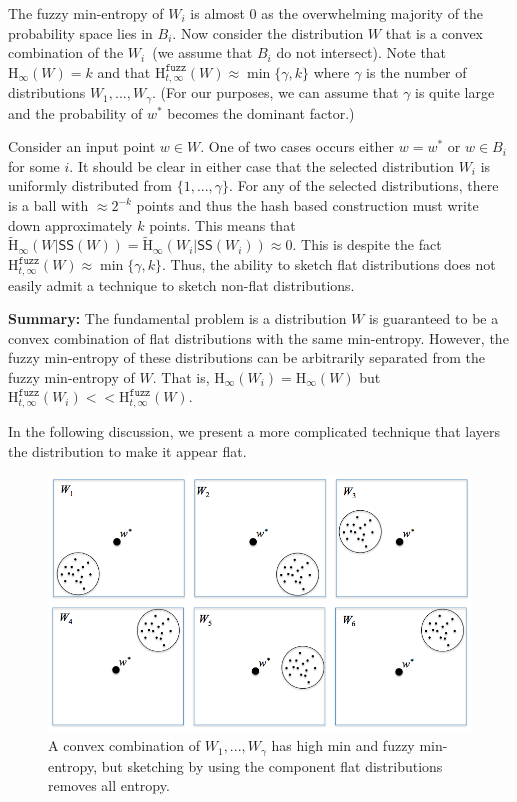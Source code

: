 \documentclass[11pt]{article}
\newcommand{\class}[1]{{\ensuremath{\mathsf{#1}}}}
\newcommand{\sketch}{\ensuremath{\class{SS}}\xspace}
\newcommand{\Hoo}{\mathrm{H}_\infty}
\newcommand{\Hav}{\tilde{\mathrm{H}}_\infty}
\newcommand{\Hfuzz}{\mathrm{H}^{\mathtt{fuzz}}_{t,\infty}}
\begin{document}
The fuzzy min-entropy of $W_i$ is almost $0$ as the overwhelming majority of the probability space lies in $B_i$.  Now consider the distribution $W$ that is a convex combination of the $W_i$~(we assume that $B_i$ do not intersect).  Note that $\Hoo(W)=k$ and that $\Hfuzz(W)\approx \min\{\gamma, k\}$ where $\gamma$ is the number of distributions $W_1,..., W_\gamma$.  (For our purposes, we can assume that $\gamma$ is quite large and the probability of $w^*$ becomes the dominant factor.)

Consider an input point $w\in W$.  One of two cases occurs either $w=w^*$ or $w\in B_i$ for some $i$.  It should be clear in either case that the selected distribution $W_i$ is uniformly distributed from $\{1,..., \gamma\}$.  For any of the selected distributions, there is a ball with $\approx 2^{-k}$ points and thus the hash based construction must write down approximately $k$ points.  This means that $\Hav(W | \sketch(W))  = \Hav(W_i | \sketch(W_i)) \approx 0$.  This is despite the fact $\Hfuzz(W) \approx \min\{\gamma, k\}$.  Thus, the ability to sketch flat distributions does not easily admit a technique to sketch non-flat distributions.  

\textbf{Summary:} The fundamental problem is a distribution $W$ is guaranteed to be a convex combination of flat distributions with the same min-entropy.  However, the fuzzy min-entropy of these distributions can be arbitrarily separated from the fuzzy min-entropy of $W$.  That is, $\Hoo(W_i) = \Hoo(W)$ but $\Hfuzz(W_i) << \Hfuzz(W)$.

In the following discussion, we present a more complicated technique that layers the distribution to make it appear flat.

\begin{figure}[t]

\centering
    \includegraphics[width=.9\textwidth]{convexCombExample.png}
    \caption{A convex combination of $W_1,..., W_\gamma$ has high min and fuzzy min-entropy, but sketching by using the component flat distributions removes all entropy.}
\label{fig:convex comb}    
\end{figure}
\end{document}
